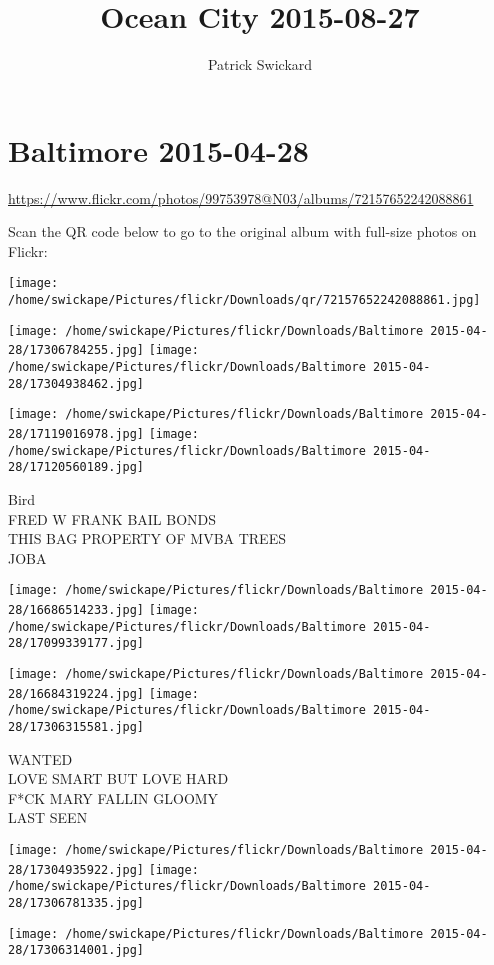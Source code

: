 \documentclass[10pt,letterpaper]{article}
\title{Ocean City 2015-08-27}
\author{Patrick Swickard}
\date{}
\begin{document}
\section*{Baltimore 2015-04-28}

\url{https://www.flickr.com/photos/99753978@N03/albums/72157652242088861}

Scan the QR code below to go to the original album with full-size photos on Flickr:

\texttt{[image: /home/swickape/Pictures/flickr/Downloads/qr/72157652242088861.jpg]}
\pagebreak

\texttt{[image: /home/swickape/Pictures/flickr/Downloads/Baltimore 2015-04-28/17306784255.jpg]}
\texttt{[image: /home/swickape/Pictures/flickr/Downloads/Baltimore 2015-04-28/17304938462.jpg]}

\texttt{[image: /home/swickape/Pictures/flickr/Downloads/Baltimore 2015-04-28/17119016978.jpg]}
\texttt{[image: /home/swickape/Pictures/flickr/Downloads/Baltimore 2015-04-28/17120560189.jpg]}

Bird\\
FRED W FRANK BAIL BONDS\\
THIS BAG PROPERTY OF MVBA TREES\\
JOBA
\pagebreak

\texttt{[image: /home/swickape/Pictures/flickr/Downloads/Baltimore 2015-04-28/16686514233.jpg]}
\texttt{[image: /home/swickape/Pictures/flickr/Downloads/Baltimore 2015-04-28/17099339177.jpg]}

\texttt{[image: /home/swickape/Pictures/flickr/Downloads/Baltimore 2015-04-28/16684319224.jpg]}
\texttt{[image: /home/swickape/Pictures/flickr/Downloads/Baltimore 2015-04-28/17306315581.jpg]}

WANTED\\
LOVE SMART BUT LOVE HARD\\
F*CK MARY FALLIN GLOOMY\\
LAST SEEN
\pagebreak

\texttt{[image: /home/swickape/Pictures/flickr/Downloads/Baltimore 2015-04-28/17304935922.jpg]}
\texttt{[image: /home/swickape/Pictures/flickr/Downloads/Baltimore 2015-04-28/17306781335.jpg]}

\vspace{0.25in}
\texttt{[image: /home/swickape/Pictures/flickr/Downloads/Baltimore 2015-04-28/17306314001.jpg]}
\end{document}
